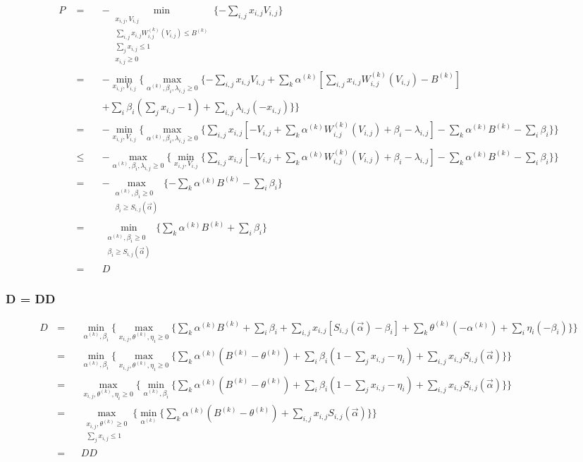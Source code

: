 \documentclass{article}
\theoremstyle{definition}
\newcommand{\sumi}{\sum\limits_i}
\newcommand{\sumj}{\sum\limits_j}
\newcommand{\sumk}{\sum\limits_k}
\newcommand{\sumij}{\sum\limits_{i,j}}
\newcommand{\sx}{x_{i,j}}
\newcommand{\sV}{V_{i,j}}
\newcommand{\sW}{W_{i,j}^{(k)}}
\newcommand{\sB}{B^{(k)}}
\newcommand{\salpha}{\alpha^{(k)}}
\newcommand{\stheta}{\theta^{(k)}}
\newcommand{\sbeta}{\beta_i}
\newcommand{\seta}{\eta_i}
\newcommand{\slambda}{\lambda_{i,j}}
\newcommand{\sS}{S_{i,j}}
\newcommand{\valpha}{\vec{\alpha}}
\newcommand{\agapresourceconstraint}{\sumij \sx \sW(\sV) \le \sB}
\newcommand{\assignmentconstraint}{\sumj \sx \le 1}
\newcommand{\scoreconstraint}{\sbeta \ge \sS(\vec{\alpha})}
\begin{document}
\begin{CJK}{UTF8}{gbsn}
\begin{align*}
    P     & = &&
        - \min\limits_{\substack{\sx,\sV \\ \agapresourceconstraint \\ \assignmentconstraint \\ \sx \ge 0 }} \{ - \sumij \sx \sV \} \\
    \quad & = &&
        - \min\limits_{\sx,\sV} \{ \max\limits_{\salpha,\sbeta,\slambda \ge 0}
        \{ - \sumij \sx \sV
        + \sumk \salpha [\sumij \sx \sW(\sV) - \sB] \\
    \quad & \quad &&
        + \sumi \sbeta (\sumj \sx - 1)
        + \sumij \slambda(-\sx) \} \} \\
    \quad & = &&
        - \min\limits_{\sx,\sV} \{ \max\limits_{\salpha,\sbeta,\slambda \ge 0}
        \{ \sumij \sx [-\sV + \sumk \salpha \sW(\sV) + \sbeta - \slambda]
        - \sumk \salpha \sB
        - \sumi \sbeta \} \} \\
    \quad & \le &&
        - \max\limits_{\salpha,\sbeta,\slambda \ge 0} \{ \min\limits_{\sx,\sV}
        \{ \sumij \sx [-\sV + \sumk \salpha \sW(\sV) + \sbeta - \slambda]
        - \sumk \salpha \sB
        - \sumi \sbeta \} \} \\
    \quad & = &&
        - \max\limits_{\substack{ \salpha,\sbeta \ge 0 \\ \scoreconstraint }}
        \{ -\sumk \salpha \sB - \sumi \sbeta \} \\
    \quad & = &&
        \min\limits_{\substack{ \salpha,\sbeta \ge 0 \\ \scoreconstraint }}
        \{ \sumk \salpha \sB + \sumi \sbeta \} \\
    \quad & = && D
\end{align*}

\subsubsection{D = DD}

\begin{align*}
    D     & = &&
        \min\limits_{\salpha,\sbeta} \{ \max\limits_{\sx,\stheta,\seta \ge 0 } \{
        \sumk \salpha \sB + \sumi \sbeta  + \sumij \sx[\sS(\valpha) - \sbeta] + \sumk \stheta (-\salpha) + \sumi \seta (-\sbeta) \} \} \\
    \quad & = &&
        \min\limits_{\salpha,\sbeta} \{ \max\limits_{\sx,\stheta,\seta\ge 0 } \{
        \sumk \salpha (\sB - \stheta) + \sumi \sbeta (1 - \sumj \sx - \seta) + \sumij \sx \sS(\valpha) \} \} \\
    \quad & = &&
        \max\limits_{\sx,\stheta,\seta \ge 0 } \{ \min\limits_{\salpha,\sbeta} \{
        \sumk \salpha (\sB - \stheta) + \sumi \sbeta (1 - \sumj \sx - \seta) + \sumij \sx \sS(\valpha) \} \} \\
    \quad & = &&
        \max\limits_{\substack{\sx,\stheta \ge 0 \\ \assignmentconstraint }} \{ \min\limits_{\salpha} \{
        \sumk \salpha (\sB - \stheta) + \sumij \sx \sS(\valpha) \} \} \\
    \quad & = && DD
\end{align*}


\end{CJK}
\end{document}
